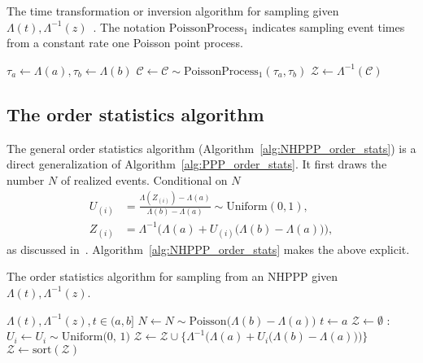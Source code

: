 \documentclass[10pt,letterpaper]{article}
\begin{document}
\begin{algorithm}[h!]
\caption{The time transformation or inversion algorithm for sampling given $\Lambda(t), \Lambda^{-1}(z)$~\cite{Cinlar1975inversion, cox1965theory}. The notation $\textrm{PoissonProcess}_1$ indicates sampling event times from a constant rate one Poisson point process.}\label{alg:NHPPP_inversion}
\begin{algorithmic}[1]
\Require{$\Lambda(t), \Lambda^{-1}(z), t \in (a, b]$} 
\State $\tau_a \gets \Lambda(a), \tau_b \gets \Lambda(b)$
\State $\mathcal{C} \gets \mathcal{C} \sim \textrm{PoissonProcess}_{1}(\tau_a, \tau_b)$  
\State $\mathcal{Z} \gets \Lambda^{-1}(\mathcal{C})$ 
\State
{} 
\end{algorithmic}
\end{algorithm}


\subsection{The order statistics algorithm}\label{sec:order-stats}
The general order statistics algorithm (Algorithm~\ref{alg:NHPPP_order_stats}) is a direct generalization of Algorithm~\ref{alg:PPP_order_stats}. It first draws the number $N$ of realized events. Conditional on $N$
\begin{equation}\label{eq:nhppp_orderstats1}
\begin{aligned}
U_{(i)} &= \frac{\Lambda(Z_{(i)}) - \Lambda(a)}{\Lambda(b)- \Lambda(a)} \sim \textrm{Uniform}(0,1), \\
Z_{(i)} &= \Lambda^{-1} \Big ( \Lambda(a) + U_{(i)} \big( \Lambda(b)- \Lambda(a) \big) \Big),
\end{aligned}
\end{equation}
as discussed in~\cite{lewis1979thinning}. Algorithm~\ref{alg:NHPPP_order_stats} makes the above explicit.

\begin{algorithm}[h!]
\caption{The order statistics algorithm for sampling from an NHPPP given $\Lambda(t), \Lambda^{-1}(z)$.}\label{alg:NHPPP_order_stats}
\begin{algorithmic}[1]
\Require $\Lambda(t), \Lambda^{-1}(z), t \in (a, b]$ 
\State $N \gets N \sim \textrm{Poisson}\big(\Lambda(b)-\Lambda(a)\big)$
\State $t \gets a$
\State $\mathcal{Z} \gets \emptyset$ 
    :
        \State $U_i \gets U_i \sim \textrm{Uniform(0, 1)}$ 
        \State $\mathcal{Z} \gets \mathcal{Z} \cup \{ \Lambda^{-1} \Big( \Lambda(a) + U_i \big( \Lambda(b) - \Lambda(a) \big)\Big) \} $ 
    \EndFor
    \State $\mathcal{Z} \gets \textrm{sort}(\mathcal{Z})$ 
\EndIf
\State
{} 
\end{algorithmic}
\end{algorithm}
\end{document}
